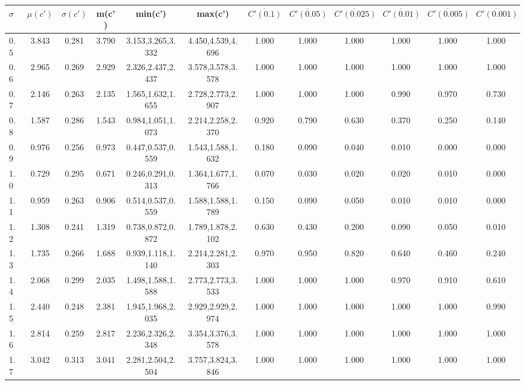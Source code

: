 \begin{table*}[h!]
\begin{center}
\begin{tabular}{| l | c | c | c | c | c | c | c | c | c | c | c |}\hline
$\sigma$ & $\mu(c')$ & $\sigma(c')$ & m(c') & min(c') & max(c') & $\overline{C'(0.1)}$ & $\overline{C'(0.05)}$ & $\overline{C'(0.025)}$ & $\overline{C'(0.01)}$ & $\overline{C'(0.005)}$ & $\overline{C'(0.001)}$ \\\hline
0.5 & 3.843 & 0.281 & 3.790 & 3.153,3.265,3.332 & 4.450,4.539,4.696  & 1.000  & 1.000  & 1.000  & 1.000  & 1.000  & 1.000 \\\hline
0.6 & 2.965 & 0.269 & 2.929 & 2.326,2.437,2.437 & 3.578,3.578,3.578  & 1.000  & 1.000  & 1.000  & 1.000  & 1.000  & 1.000 \\\hline
0.7 & 2.146 & 0.263 & 2.135 & 1.565,1.632,1.655 & 2.728,2.773,2.907  & 1.000  & 1.000  & 1.000  & 0.990  & 0.970  & 0.730 \\\hline
0.8 & 1.587 & 0.286 & 1.543 & 0.984,1.051,1.073 & 2.214,2.258,2.370  & 0.920  & 0.790  & 0.630  & 0.370  & 0.250  & 0.140 \\\hline
0.9 & 0.976 & 0.256 & 0.973 & 0.447,0.537,0.559 & 1.543,1.588,1.632  & 0.180  & 0.090  & 0.040  & 0.010  & 0.000  & 0.000 \\\hline
1.0 & 0.729 & 0.295 & 0.671 & 0.246,0.291,0.313 & 1.364,1.677,1.766  & 0.070  & 0.030  & 0.020  & 0.020  & 0.010  & 0.000 \\\hline
1.1 & 0.959 & 0.263 & 0.906 & 0.514,0.537,0.559 & 1.588,1.588,1.789  & 0.150  & 0.090  & 0.050  & 0.010  & 0.010  & 0.000 \\\hline
1.2 & 1.308 & 0.241 & 1.319 & 0.738,0.872,0.872 & 1.789,1.878,2.102  & 0.630  & 0.430  & 0.200  & 0.090  & 0.050  & 0.010 \\\hline
1.3 & 1.735 & 0.266 & 1.688 & 0.939,1.118,1.140 & 2.214,2.281,2.303  & 0.970  & 0.950  & 0.820  & 0.640  & 0.460  & 0.240 \\\hline
1.4 & 2.068 & 0.299 & 2.035 & 1.498,1.588,1.588 & 2.773,2.773,3.533  & 1.000  & 1.000  & 1.000  & 0.970  & 0.910  & 0.610 \\\hline
1.5 & 2.440 & 0.248 & 2.381 & 1.945,1.968,2.035 & 2.929,2.929,2.974  & 1.000  & 1.000  & 1.000  & 1.000  & 1.000  & 0.990 \\\hline
1.6 & 2.814 & 0.259 & 2.817 & 2.236,2.326,2.348 & 3.354,3.376,3.578  & 1.000  & 1.000  & 1.000  & 1.000  & 1.000  & 1.000 \\\hline
1.7 & 3.042 & 0.313 & 3.041 & 2.281,2.504,2.504 & 3.757,3.824,3.846  & 1.000  & 1.000  & 1.000  & 1.000  & 1.000  & 1.000 \\\hline

\end{tabular}
\end{center}
\end{table*}
